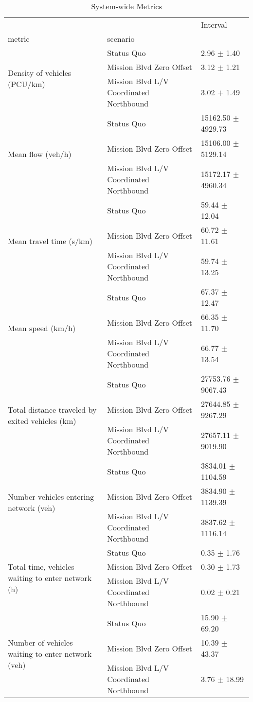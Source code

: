 \begin{table}
\caption{System-wide Metrics}
\begin{tabular}{lll}
\toprule
 &  & Interval \\
metric & scenario &  \\
\midrule
\multirow[t]{3}{*}{Density of vehicles (PCU/km)} & Status Quo & 2.96 $\pm$ 1.40 \\
 & Mission Blvd Zero Offset & 3.12 $\pm$ 1.21 \\
 & Mission Blvd L/V Coordinated Northbound & 3.02 $\pm$ 1.49 \\
\multirow[t]{3}{*}{Mean flow (veh/h)} & Status Quo & 15162.50 $\pm$ 4929.73 \\
 & Mission Blvd Zero Offset & 15106.00 $\pm$ 5129.14 \\
 & Mission Blvd L/V Coordinated Northbound & 15172.17 $\pm$ 4960.34 \\
\multirow[t]{3}{*}{Mean travel time (s/km)} & Status Quo & 59.44 $\pm$ 12.04 \\
 & Mission Blvd Zero Offset & 60.72 $\pm$ 11.61 \\
 & Mission Blvd L/V Coordinated Northbound & 59.74 $\pm$ 13.25 \\
\multirow[t]{3}{*}{Mean speed (km/h)} & Status Quo & 67.37 $\pm$ 12.47 \\
 & Mission Blvd Zero Offset & 66.35 $\pm$ 11.70 \\
 & Mission Blvd L/V Coordinated Northbound & 66.77 $\pm$ 13.54 \\
\multirow[t]{3}{*}{Total distance traveled by exited vehicles (km)} & Status Quo & 27753.76 $\pm$ 9067.43 \\
 & Mission Blvd Zero Offset & 27644.85 $\pm$ 9267.29 \\
 & Mission Blvd L/V Coordinated Northbound & 27657.11 $\pm$ 9019.90 \\
\multirow[t]{3}{*}{Number vehicles entering network (veh)} & Status Quo & 3834.01 $\pm$ 1104.59 \\
 & Mission Blvd Zero Offset & 3834.90 $\pm$ 1139.39 \\
 & Mission Blvd L/V Coordinated Northbound & 3837.62 $\pm$ 1116.14 \\
\multirow[t]{3}{*}{Total time, vehicles waiting to enter network (h)} & Status Quo & 0.35 $\pm$ 1.76 \\
 & Mission Blvd Zero Offset & 0.30 $\pm$ 1.73 \\
 & Mission Blvd L/V Coordinated Northbound & 0.02 $\pm$ 0.21 \\
\multirow[t]{3}{*}{Number of vehicles waiting to enter network (veh)} & Status Quo & 15.90 $\pm$ 69.20 \\
 & Mission Blvd Zero Offset & 10.39 $\pm$ 43.37 \\
 & Mission Blvd L/V Coordinated Northbound & 3.76 $\pm$ 18.99 \\
\bottomrule
\end{tabular}
\end{table}
